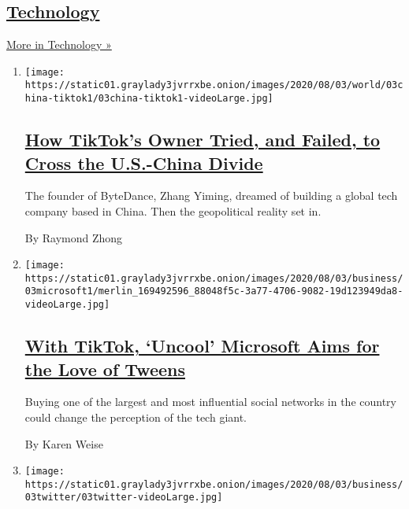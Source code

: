 \hypertarget{technology-1}{%
\subsection{\texorpdfstring{\href{/section/technology}{Technology}}{Technology}}\label{technology-1}}

\href{/section/technology}{More in Technology »}

\begin{enumerate}
\def\labelenumi{\arabic{enumi}.}
\item
  \texttt{[image: https://static01.graylady3jvrrxbe.onion/images/2020/08/03/world/03china-tiktok1/03china-tiktok1-videoLarge.jpg]}

  \hypertarget{how-tiktoks-owner-tried-and-failed-to-cross-the-us-china-divide}{%
  \subsection{\texorpdfstring{\href{/2020/08/03/technology/tiktok-bytedance-us-china.html}{How
  TikTok's Owner Tried, and Failed, to Cross the U.S.-China
  Divide}}{How TikTok's Owner Tried, and Failed, to Cross the U.S.-China Divide}}\label{how-tiktoks-owner-tried-and-failed-to-cross-the-us-china-divide}}

  The founder of ByteDance, Zhang Yiming, dreamed of building a global
  tech company based in China. Then the geopolitical reality set in.

  By Raymond Zhong
\item
  \texttt{[image: https://static01.graylady3jvrrxbe.onion/images/2020/08/03/business/03microsoft1/merlin\_169492596\_88048f5c-3a77-4706-9082-19d123949da8-videoLarge.jpg]}

  \hypertarget{with-tiktok-uncool-microsoft-aims-for-the-love-of-tweens}{%
  \subsection{\texorpdfstring{\href{/2020/08/03/technology/tiktok-microsoft-tweens.html}{With
  TikTok, `Uncool' Microsoft Aims for the Love of
  Tweens}}{With TikTok, `Uncool' Microsoft Aims for the Love of Tweens}}\label{with-tiktok-uncool-microsoft-aims-for-the-love-of-tweens}}

  Buying one of the largest and most influential social networks in the
  country could change the perception of the tech giant.

  By Karen Weise
\item
  \texttt{[image: https://static01.graylady3jvrrxbe.onion/images/2020/08/03/business/03twitter/03twitter-videoLarge.jpg]}


\end{enumerate}
